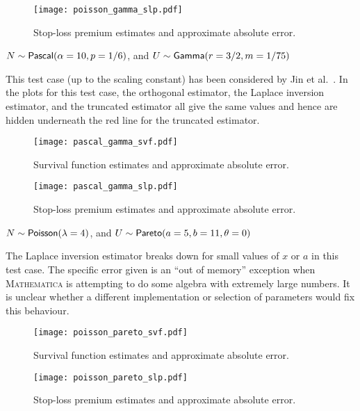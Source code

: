 \begin{figure}[H]
\centering
\texttt{[image: poisson\_gamma\_slp.pdf]}
\caption{Stop-loss premium estimates and approximate absolute error.}
\end{figure}


\begin{test}
$N\sim\mathsf{Pascal}(\alpha=10,p=1/6)$, and $U\sim\mathsf{Gamma}(r=3/2,m=1/75)$
\end{test}

This test case (up to the scaling constant) has been considered by Jin et al.\ \cite[Example 3]{JiPrRe16}. In the plots for this test case, the orthogonal estimator, the Laplace inversion estimator, and the truncated estimator all give the same values and hence are hidden underneath the red line for the truncated estimator.

\begin{figure}[H]
\centering
\texttt{[image: pascal\_gamma\_svf.pdf]}
\caption{Survival function estimates and approximate absolute error.}
\end{figure}

\begin{figure}[H]
\centering
\texttt{[image: pascal\_gamma\_slp.pdf]}
\caption{Stop-loss premium estimates and approximate absolute error.}
\end{figure}

\begin{test} \label{test:poiss_pareto} $N\sim\mathsf{Poisson}(\lambda=4)$, and $U\sim\mathsf{Pareto}(a=5,b=11,\theta=0)$
\end{test}
The Laplace inversion estimator breaks down for small values of $x$ or $a$ in this test case. The specific error given is an ``out of memory'' exception when \textsc{Mathematica} is attempting to do some algebra with extremely large numbers. It is unclear whether a different implementation or selection of parameters would fix this behaviour.

\begin{figure}[H]
\centering
\texttt{[image: poisson\_pareto\_svf.pdf]}
\caption{Survival function estimates and approximate absolute error.}
\end{figure}

\begin{figure}[H]
\centering
\texttt{[image: poisson\_pareto\_slp.pdf]}
\caption{Stop-loss premium estimates and approximate absolute error.}
\end{figure}

